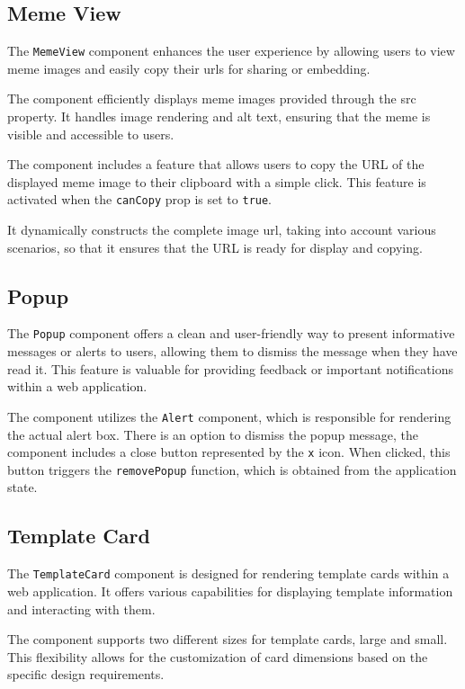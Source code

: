 \subsection{Meme View}

The \texttt{MemeView} component enhances the user experience by allowing users to view meme images and easily copy their \acrshort{url}s for sharing or embedding.

The component efficiently displays meme images provided through the src property. It handles image rendering and alt text, ensuring that the meme is visible and accessible to users.

The component includes a feature that allows users to copy the URL of the displayed meme image to their clipboard with a simple click. This feature is activated when the \texttt{canCopy} prop is set to \texttt{true}.

It dynamically constructs the complete image \acrshort{url}, taking into account various scenarios, so that it ensures that the URL is ready for display and copying.

\subsection{Popup}

The \texttt{Popup} component offers a clean and user-friendly way to present informative messages or alerts to users, allowing them to dismiss the message when they have read it. This feature is valuable for providing feedback or important notifications within a web application.

The component utilizes the \texttt{Alert} component, which is responsible for rendering the actual alert box. There is an option to dismiss the popup message, the component includes a close button represented by the \texttt{x} icon. When clicked, this button triggers the \texttt{removePopup} function, which is obtained from the application state.

\subsection{Template Card}

The \texttt{TemplateCard} component is designed for rendering template cards within a web application. It offers various capabilities for displaying template information and interacting with them.

The component supports two different sizes for template cards, large and small. This flexibility allows for the customization of card dimensions based on the specific design requirements.

